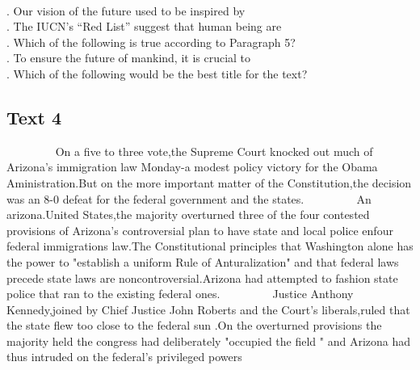     \begin{questions} . Our vision of the future used to be inspired by
    \\ . The IUCN’s “Red List” suggest that human being are
    \\ . Which of the following is true according to Paragraph 5?
    \\ . To ensure the future of mankind, it is crucial to
    \\ . Which of the following would be the best title for the text?
    \\ \end{questions}      \subsection{Text 4}
    
    On a five to three vote,the Supreme Court knocked out much of Arizona's immigration law Monday-a modest policy victory for the Obama Aministration.But on the more important matter of the Constitution,the decision was an 8-0 defeat for the federal government and the states.
    
    An arizona.United States,the majority overturned three of the four contested provisions of Arizona's controversial plan to have state and local police enfour federal immigrations law.The Constitutional principles that Washington alone has the power to "establish a uniform Rule of Anturalization" and that federal laws precede state laws are noncontroversial.Arizona had attempted to fashion state police that ran to the existing federal ones.
    
    Justice Anthony Kennedy,joined by Chief Justice John Roberts and the Court's liberals,ruled that the state flew too close to the federal sun .On the overturned provisions the majority held the congress had deliberately "occupied the field " and Arizona had thus intruded on the federal's privileged powers
